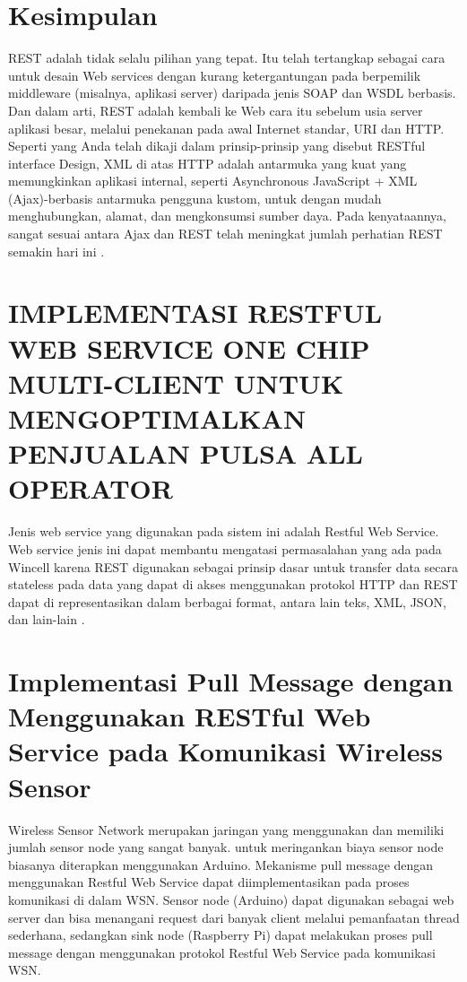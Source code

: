 \section{Kesimpulan}
REST adalah tidak selalu pilihan yang tepat. Itu telah tertangkap sebagai cara untuk desain Web services dengan kurang ketergantungan pada berpemilik middleware (misalnya, aplikasi server) daripada jenis SOAP dan WSDL berbasis. Dan dalam arti, REST adalah kembali ke Web cara itu sebelum usia server aplikasi besar, melalui penekanan pada awal Internet standar, URI dan HTTP. Seperti yang Anda telah dikaji dalam prinsip-prinsip yang disebut RESTful interface Design, XML di atas HTTP adalah antarmuka yang kuat yang memungkinkan aplikasi internal, seperti Asynchronous JavaScript + XML (Ajax)-berbasis antarmuka pengguna kustom, untuk dengan mudah menghubungkan, alamat, dan mengkonsumsi sumber daya. Pada kenyataannya, sangat sesuai antara Ajax dan REST telah meningkat jumlah perhatian REST semakin hari ini \cite{rodriguez2008restful}.

\section{IMPLEMENTASI RESTFUL WEB SERVICE ONE CHIP MULTI-CLIENT UNTUK MENGOPTIMALKAN PENJUALAN PULSA ALL OPERATOR}
Jenis web service yang digunakan pada sistem ini adalah Restful Web Service. Web service jenis ini dapat membantu mengatasi permasalahan yang ada pada Wincell karena REST digunakan sebagai prinsip dasar untuk transfer data secara stateless pada data yang dapat di akses menggunakan protokol HTTP dan REST dapat di representasikan dalam berbagai format, antara lain teks, XML, JSON, dan lain-lain
\cite{indrawan2017implementasi}.

\section{Implementasi Pull Message dengan Menggunakan RESTful Web Service pada Komunikasi Wireless Sensor}
Wireless Sensor Network merupakan jaringan yang menggunakan dan memiliki jumlah sensor node yang sangat banyak. untuk meringankan biaya sensor node biasanya diterapkan menggunakan Arduino. Mekanisme pull message dengan menggunakan Restful Web Service dapat diimplementasikan pada proses komunikasi di dalam WSN. Sensor node (Arduino) dapat digunakan sebagai web server dan bisa menangani request dari banyak client melalui pemanfaatan thread sederhana, sedangkan sink node (Raspberry Pi) dapat melakukan proses pull message dengan menggunakan protokol Restful Web Service pada komunikasi WSN. 
\cite{hidayatullah2017implementasi}
